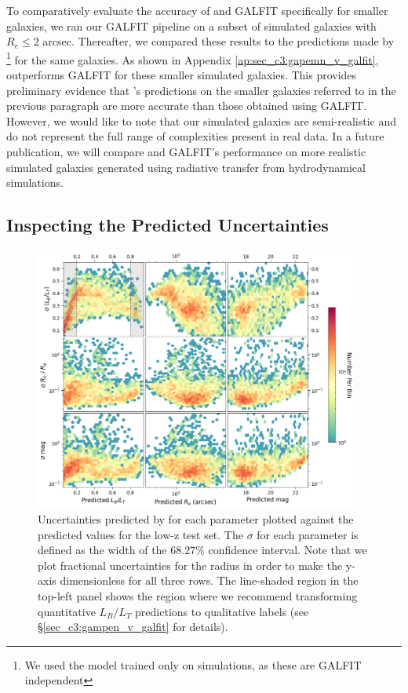 To comparatively evaluate the accuracy of \gampen{} and GALFIT specifically for smaller galaxies, we ran our GALFIT pipeline on a subset of simulated galaxies with $R_e \leq 2$ arcsec. Thereafter, we compared these results to the predictions made by \gampen{}\footnote{We used the \gampen{} model trained only on simulations, as these are GALFIT independent} for the same galaxies. As shown in Appendix \ref{ap:sec_c3:gapemn_v_galfit}, \gampen{} outperforms GALFIT for these smaller simulated galaxies. This provides preliminary evidence that \gampen{}'s predictions on the smaller galaxies referred to in the previous paragraph are more accurate than those obtained using GALFIT. However, we would like to note that our simulated galaxies are semi-realistic and do not represent the full range of complexities present in real data. In a future publication, we will compare \gampen{} and GALFIT's performance on more realistic simulated galaxies generated using radiative transfer from hydrodynamical simulations.

\subsection{Inspecting the Predicted Uncertainties} \label{sec_c3:uncertainties}

\begin{figure}[htb]
    \centering
    \includegraphics[width = 0.95\textwidth]{2d_uncer_low_z.png}
    \caption{Uncertainties predicted by \gampen{} for each parameter plotted against the predicted values for the low-z test set. The $\sigma$ for each parameter is defined as the width of the $68.27\%$ confidence interval. Note that we plot fractional uncertainties for the radius in order to make the y-axis dimensionless for all three rows. The line-shaded region in the top-left panel shows the region where we recommend transforming quantitative $L_B/L_T$ predictions to qualitative labels (see \S \ref{sec_c3:gampen_v_galfit} for details).}
    \label{fig_c3:2d_uncer_low_z}
\end{figure}

